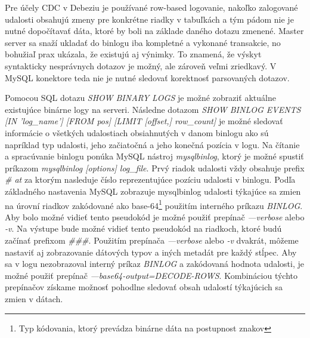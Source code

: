 Pre účely CDC v Debeziu je používané row-based logovanie, nakoľko zalogované udalosti obsahujú zmeny pre konkrétne riadky v tabuľkách a tým pádom nie je nutné dopočítavať dáta, ktoré by boli na základe daného dotazu zmenené. Master server sa snaží ukladať do binlogu iba kompletné a vykonané transakcie, no bohužiaľ prax ukázala, že existujú aj výnimky. To znamená, že výskyt syntakticky nesprávnych dotazov je možný, ale zároveň veľmi zriedkavý. V MySQL konektore teda nie je nutné sledovať korektnosť parsovaných dotazov.

Pomocou SQL dotazu \textit{SHOW BINARY LOGS} je možné zobraziť aktuálne existujúce binárne logy na serveri. Následne dotazom \textit{SHOW BINLOG EVENTS [IN 'log\_name']  [FROM pos] [LIMIT [offset,] row\_count]} je možné sledovať informácie o všetkých udalostiach obsiahnutých v danom binlogu ako sú napríklad typ udalosti, jeho začiatočná a jeho konečná pozícia v logu. Na čítanie a spracúvanie binlogu ponúka MySQL nástroj \textit{mysqlbinlog}, ktorý je možné spustiť príkazom \textit{mysqlbinlog [options] log\_file}. Prvý riadok udalosti vždy obsahuje prefix \textit{\# at} za ktorým nasleduje číslo reprezentujúce pozíciu udalosti v binlogu. Podľa základného nastavenia MySQL zobrazuje mysqlbinlog udalosti týkajúce sa zmien na úrovní riadkov zakódované ako base-64\footnote{Typ kódovania, ktorý prevádza binárne dáta na postupnost znakov} použitím interného príkazu \textit{BINLOG}. Aby bolo možné vidieť tento pseudokód je možné použiť prepínač \textit{---verbose} alebo \textit{-v}. Na výstupe bude možné vidieť tento pseudokód na riadkoch, ktoré budú začínať prefixom  \textit{\#\#\#}. Použitím prepínača \textit{---verbose} alebo \textit{-v} dvakrát, môžeme nastaviť aj zobrazovanie dátových typov a iných metadát pre každý stĺpec. Aby sa v logu nezobrazoval interný príkaz \textit{BINLOG} a zakódovaná hodnota udalosti, je možné použiť prepínač \textit{---base64-output=DECODE-ROWS}. Kombináciou týchto prepínačov získame možnosť pohodlne sledovať obsah udalostí týkajúcich sa zmien v dátach. \cite{mysql:reference_manual}

